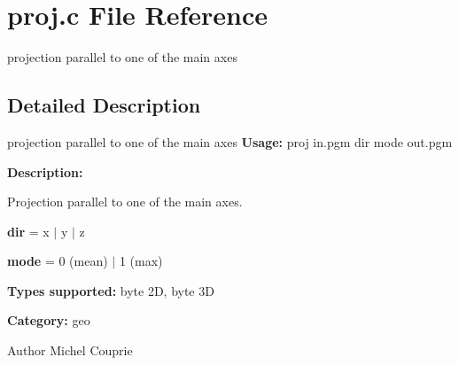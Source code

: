 \section{proj.c File Reference}
\label{proj_8c}


projection parallel to one of the main axes  




\subsection{Detailed Description}
projection parallel to one of the main axes {\bfseries Usage:} proj in.pgm dir mode out.pgm

{\bfseries Description:}

Projection parallel to one of the main axes.

{\bfseries dir} = x $|$ y $|$ z

{\bfseries mode} = 0 (mean) $|$ 1 (max)

{\bfseries Types supported:} byte 2D, byte 3D

{\bfseries Category:} geo

\begin{DoxyAuthor}{Author}
Michel Couprie 
\end{DoxyAuthor}
